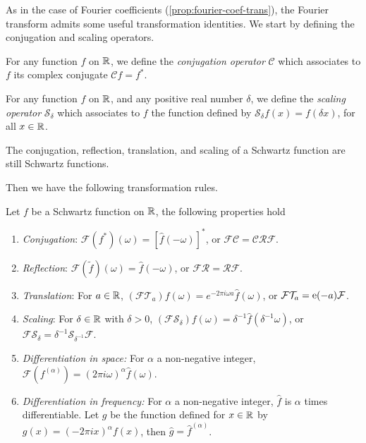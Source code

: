 As in the case of Fourier coefficients (\cref{prop:fourier-coef-trans}), the Fourier
transform admits some useful transformation identities. We start by defining the
conjugation and scaling operators.
\begin{definition}
  For any function $f$ on $\mathbb{R}$, we define the \emph{conjugation operator} $\mathcal{C}$
  which associates to $f$ its complex conjugate $\mathcal{C}f=f^*$.
\end{definition}
\begin{definition}
  For any function $f$ on $\mathbb{R}$, and any positive real number $\delta$, we define the
  \emph{scaling operator} $\mathcal{S}_{\delta}$ which associates to $f$ the function
  defined by $\mathcal{S}_{\delta}f(x)=f(\delta x)$, for all $x\in\mathbb{R}$.
\end{definition}
\begin{proposition}
  The conjugation, reflection, translation, and scaling of a Schwartz function are still
  Schwartz functions.
\end{proposition}
Then we have the following transformation rules.
\begin{proposition}
  \label{prop:ft-trans}
  Let $f$ be a Schwartz function on $\mathbb{R}$, the following properties hold
  \begin{enumerate}
    \item \emph{Conjugation}: $\mathcal{F}(f^*)(\omega)=[\hat{f}(-\omega)]^*$, or
      $\mathcal{F}\mathcal{C}=\mathcal{C}\mathcal{R}\mathcal{F}$.
    \item \emph{Reflection}: $\mathcal{F}(\tilde{f})(\omega)=\hat{f}(-\omega)$, or
      $\mathcal{F}\mathcal{R}=\mathcal{R}\mathcal{F}$.
    \item \emph{Translation}: For $a\in\mathbb{R}$, $(\mathcal{F}\mathcal{T}_{a})f(\omega)
      =e^{-2\pi i\omega a}\hat{f}(\omega)$, or
      $\mathcal{F}\mathcal{T}_{a}=\operatorname{e}(-a)\mathcal{F}$.
    \item \emph{Scaling}: For $\delta\in\mathbb{R}$ with $\delta>0$,
      $(\mathcal{F}\mathcal{S}_{\delta})f(\omega)=\delta^{-1}\hat{f}(\delta^{-1}\omega)$,
      or
      $\mathcal{F}\mathcal{S}_{\delta}=\delta^{-1}\mathcal{S}_{\delta^{-1}}\mathcal{F}$.
    \item \emph{Differentiation in space:} For $\alpha$ a non-negative integer,
      $\mathcal{F}(f^{(\alpha )})=(2\pi i\omega)^{\alpha}\hat{f}(\omega)$.
    \item \emph{Differentiation in frequency:} For $\alpha$ a non-negative integer,
      $\hat{f}$ is $\alpha$ times differentiable. Let $g$ be the function defined for
      $x\in\mathbb{R}$ by $g(x)=(-2\pi ix)^\alpha f(x)$, then $\hat{g}=\hat{f}^{(\alpha)}$.
  \end{enumerate}
\end{proposition}
